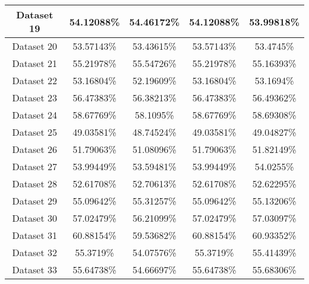 \begin{table}
\begin{tabular}{ |c||c|c|c|c| }
    \hline
    Dataset 19& 54.12088\%& 54.46172\%& 54.12088\%& 53.99818\%\\
    \hline
    Dataset 20& 53.57143\%& 53.43615\%& 53.57143\%& 53.4745\%\\
    \hline
    Dataset 21& 55.21978\%& 55.54726\%& 55.21978\%& 55.16393\%\\
    \hline
    Dataset 22& 53.16804\%& 52.19609\%& 53.16804\%& 53.1694\%\\
    \hline
    Dataset 23& 56.47383\%& 56.38213\%& 56.47383\%& 56.49362\%\\
    \hline
    Dataset 24& 58.67769\%& 58.1095\%& 58.67769\%& 58.69308\%\\
    \hline
    Dataset 25& 49.03581\%& 48.74524\%& 49.03581\%& 49.04827\%\\
    \hline
    Dataset 26& 51.79063\%& 51.08096\%& 51.79063\%& 51.82149\%\\
    \hline
    Dataset 27& 53.99449\%& 53.59481\%& 53.99449\%& 54.0255\%\\
    \hline
    Dataset 28& 52.61708\%& 52.70613\%& 52.61708\%& 52.62295\%\\
    \hline
    Dataset 29& 55.09642\%& 55.31257\%& 55.09642\%& 55.13206\%\\
    \hline
    Dataset 30& 57.02479\%& 56.21099\%& 57.02479\%& 57.03097\%\\
    \hline
    Dataset 31& 60.88154\%& 59.53682\%& 60.88154\%& 60.93352\%\\
    \hline
    Dataset 32& 55.3719\%& 54.07576\%& 55.3719\%& 55.41439\%\\
    \hline
    Dataset 33& 55.64738\%& 54.66697\%& 55.64738\%& 55.68306\%\\
    \hline
\end{tabular}
\end{table}
